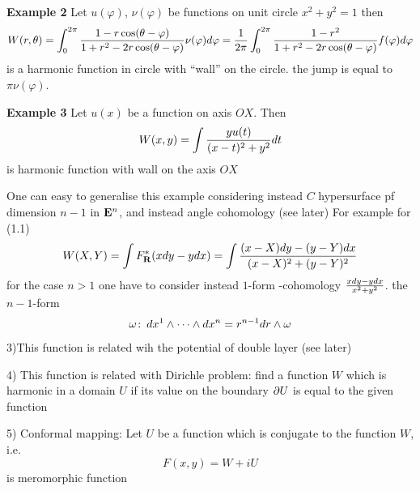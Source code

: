 {\bf Example 2}  Let $u(\varphi)$,
$\nu(\varphi)$ be functions
on unit circle $x^2+y^2=1$ then
              $$
  W(r,\theta)=\int_0^{2\pi}{1-r\cos(\theta-\varphi)\over 
      1+r^2-2r\cos(\theta-\varphi)}
      \nu(\varphi)d\varphi=
 {1\over 2\pi}\int_0^{2\pi}{1-r^2\over 
      1+r^2-2r\cos(\theta-\varphi)}
      f(\varphi)d\varphi
              $$
is a harmonic function in circle with ``wall'' on the circle.
the jump is equal to $\pi \nu(\varphi)$.


\m

{\bf Example 3} Let $u(x)$ be a function on axis $OX$. Then
                $$
   W(x,y)=\int {yu(t)\over (x-t)^2+y^2}dt
                $$
is harmonic function with wall on the axis $OX$

\m

One can easy to generalise this example considering
 instead $C$ hypersurface pf dimension $n-1$ in ${\bf E}^n$,
and instead angle cohomology  (see later)
For example for (1.1)
              $$
W(X,Y)=\int F^*_{\bf R}(xdy-ydx)=\int {(x-X)dy-(y-Y)dx\over (x-X)^2+(y-Y)^2}
                   $$
for the case $n>1$ one have to consider instead $1$-form -cohomology
    $xdy-ydx\over x^2+y^2$. the $n-1$-form
              $$
\omega\colon\,   dx^1\wedge\dots\wedge dx^n=r^{n-1}dr \wedge \omega
              $$    


3)This function is related wih the potential of double layer
  (see later)


4) This function is related with Dirichle problem:
 find a function $W$ which is harmonic in a domain $U$
  if its value on the boundary $\partial U$ is equal to 
the given function


5)  Conformal mapping: Let $U$ be a function which is conjugate
to the function $W$, i.e.
               $$
        F(x,y)=W+iU
               $$
is meromorphic function




\bye
